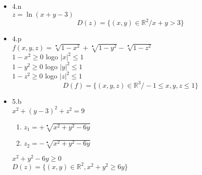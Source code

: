 \documentclass{article}
\begin{document}
\begin{itemize}
		\item 4.n
		\\$z = \ln (x+y-3)$
		$$D(z) = \{(x,y) \in \mathbb{R}^2 / x+y > 3\}$$
		\item 4.p
		\\$f(x,y,z)=\sqrt[•]{1-x^2}+\sqrt[•]{1-y^2}-\sqrt[•]{1-z^2}$
		\\$1-x^2\geq 0$   logo    $|x|^2 \leq 1$
		\\$1-y^2 \geq 0$  logo    $|y|^2 \leq 1$
		\\$1-z^2 \geq 0$  logo    $|z|^2 \leq 1$
		$$D(f)=\{(x,y,z) \in \mathbb{R}^3 / -1\leq x,y,z \leq 1\}$$
		\item 5.b
		\\$x^2+(y-3)^2+z^2 = 9$
		\begin{enumerate}
		\item$z_1=+\sqrt[•]{x^2+y^2-6y}$
		\item$z_2=-\sqrt[•]{x^2+y^2-6y}$
		\end{enumerate}
		$x^2+y^2 - 6y \geq 0$
		\\$D(z)=\{(x,y)\in \mathbb{R}^2, x^2+y^2 \geq 6y\}$
	\end{itemize}
%
\end{document}
